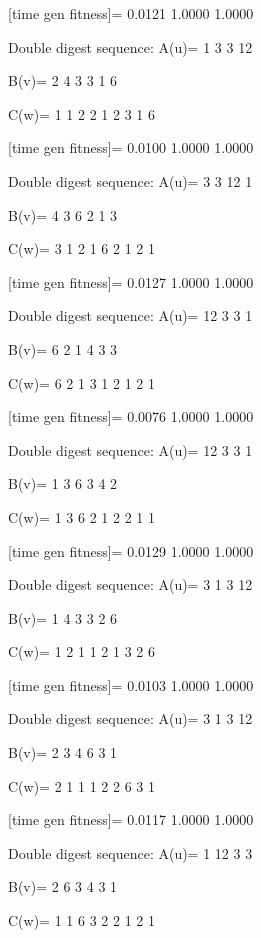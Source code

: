 [time gen fitness]=
    0.0121    1.0000    1.0000

Double digest sequence:
A(u)=
     1     3     3    12

B(v)=
     2     4     3     3     1     6

C(w)=
     1     1     2     2     1     2     3     1     6

[time gen fitness]=
    0.0100    1.0000    1.0000

Double digest sequence:
A(u)=
     3     3    12     1

B(v)=
     4     3     6     2     1     3

C(w)=
     3     1     2     1     6     2     1     2     1

[time gen fitness]=
    0.0127    1.0000    1.0000

Double digest sequence:
A(u)=
    12     3     3     1

B(v)=
     6     2     1     4     3     3

C(w)=
     6     2     1     3     1     2     1     2     1

[time gen fitness]=
    0.0076    1.0000    1.0000

Double digest sequence:
A(u)=
    12     3     3     1

B(v)=
     1     3     6     3     4     2

C(w)=
     1     3     6     2     1     2     2     1     1

[time gen fitness]=
    0.0129    1.0000    1.0000

Double digest sequence:
A(u)=
     3     1     3    12

B(v)=
     1     4     3     3     2     6

C(w)=
     1     2     1     1     2     1     3     2     6

[time gen fitness]=
    0.0103    1.0000    1.0000

Double digest sequence:
A(u)=
     3     1     3    12

B(v)=
     2     3     4     6     3     1

C(w)=
     2     1     1     1     2     2     6     3     1

[time gen fitness]=
    0.0117    1.0000    1.0000

Double digest sequence:
A(u)=
     1    12     3     3

B(v)=
     2     6     3     4     3     1

C(w)=
     1     1     6     3     2     2     1     2     1


